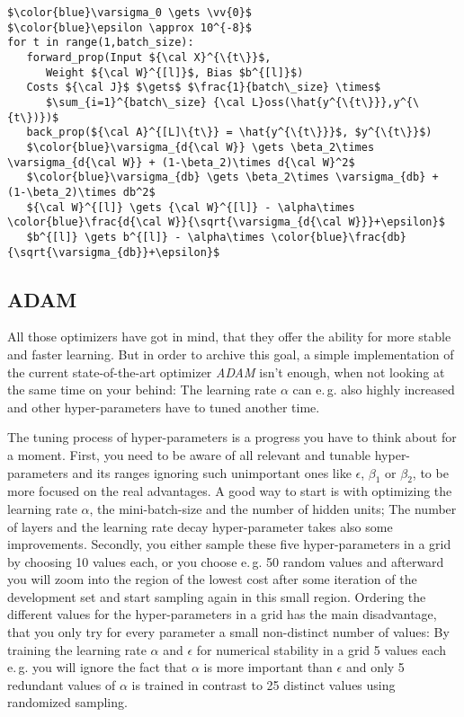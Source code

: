 \documentclass[dvipsnames,twocolumn]{scrartcl}
\begin{document}
	
	\begin{lstlisting}[frame=single,caption={\texttt{Stochastic Gradient Descent with RMSProp} Algorithm}]
$\color{blue}\varsigma_0 \gets \vv{0}$
$\color{blue}\epsilon \approx 10^{-8}$
for t in range(1,batch_size):
   forward_prop(Input ${\cal X}^{\{t\}}$,
      Weight ${\cal W}^{[l]}$, Bias $b^{[l]}$)
   Costs ${\cal J}$ $\gets$ $\frac{1}{batch\_size} \times$
      $\sum_{i=1}^{batch\_size} {\cal L}oss(\hat{y^{\{t\}}},y^{\{t\})})$
   back_prop(${\cal A}^{[L]\{t\}} = \hat{y^{\{t\}}}$, $y^{\{t\}}$)
   $\color{blue}\varsigma_{d{\cal W}} \gets \beta_2\times \varsigma_{d{\cal W}} + (1-\beta_2)\times d{\cal W}^2$
   $\color{blue}\varsigma_{db} \gets \beta_2\times \varsigma_{db} + (1-\beta_2)\times db^2$
   ${\cal W}^{[l]} \gets {\cal W}^{[l]} - \alpha\times \color{blue}\frac{d{\cal W}}{\sqrt{\varsigma_{d{\cal W}}}+\epsilon}$
   $b^{[l]} \gets b^{[l]} - \alpha\times \color{blue}\frac{db}{\sqrt{\varsigma_{db}}+\epsilon}$
	\end{lstlisting}
	
	\subsection{ADAM}
	
	All those optimizers have got in mind, that they offer the ability for more stable and faster learning. But in order to archive this goal, a simple implementation of the current state-of-the-art optimizer \emph{ADAM} isn't enough, when not looking at the same time on your behind: The learning rate $\alpha$ can e.\,g. also highly increased and other hyper-parameters have to tuned another time.
	
	The tuning process of hyper-parameters is a progress you have to think about for a moment. First, you need to be aware of all relevant and tunable hyper-parameters and its ranges ignoring such unimportant ones like $\epsilon$, $\beta_1$ or $\beta_2$, to be more focused on the real advantages. A good way to start is with optimizing the learning rate $\alpha$, the mini-batch-size and the number of hidden units; The number of layers and the learning rate decay hyper-parameter takes also some improvements. Secondly, you either sample these five hyper-parameters in a grid by choosing 10 values each, or you choose e.\,g. 50 random values and afterward you will zoom into the region of the lowest cost after some iteration of the development set and start sampling again in this small region. Ordering the different values for the hyper-parameters in a grid has the main disadvantage, that you only try for every parameter a small non-distinct number of values: By training the learning rate $\alpha$ and $\epsilon$ for numerical stability in a grid 5 values each e.\,g. you will ignore the fact that $\alpha$ is more important than $\epsilon$ and only 5 redundant values of $\alpha$ is trained in contrast to 25 distinct values using randomized sampling.
	
\end{document}
